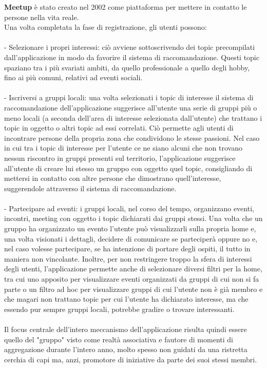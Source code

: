 \documentclass[fleqn,10pt]{SelfArx} %
\begin{document}
{\small %
\textbf{Meetup} è stato creato nel 2002 come piattaforma per mettere in contatto le persone nella vita reale.\\
Una volta completata la fase di registrazione, gli utenti possono: \\
\\
- Selezionare i propri interessi: ciò avviene sottoscrivendo dei topic precompilati dall'applicazione in modo da favorire il sistema di raccomandazione. 
Questi topic spaziano tra i più svariati ambiti, da quello professionale a quello degli hobby, fino ai più comuni, relativi ad eventi sociali. \\
\\
- Iscriversi a gruppi locali: una volta selezionati i topic di interesse il sistema di raccomandazione dell'applicazione suggerisce all'utente una serie di gruppi più o meno locali (a seconda dell'area di interesse selezionata dall'utente) che trattano i topic in oggetto o altri topic ad essi correlati. 
Ciò permette agli utenti di incontrare persone della propria zona che condividono le stesse passioni. 
Nel caso in cui tra i topic di interesse per l'utente ce ne siano alcuni che non trovano nessun riscontro in gruppi presenti sul territorio, l'applicazione suggerisce all'utente di creare lui stesso un gruppo con oggetto quel topic, consigliando di mettersi in contatto con altre persone che dimostrano quell'interesse, suggerendole attraverso il sistema di raccomandazione.\\
\\
- Partecipare ad eventi: i gruppi locali, nel corso del tempo, organizzano eventi, incontri, meeting con oggetto i topic dichiarati dai gruppi stessi. 
Una volta che un gruppo ha organizzato un evento l'utente può visualizzarli sulla propria home e, una volta visionati i dettagli, decidere di comunicare se parteciperà oppure no e, nel caso volesse partecipare, se ha intenzione di portare degli ospiti, il tutto in maniera non vincolante. 
Inoltre, per non restringere troppo la sfera di interessi degli utenti, l'applicazione permette anche di selezionare diversi filtri per la home, tra cui uno apposito per visualizzare eventi organizzati da gruppi di cui non si fa parte o un filtro ad hoc per visualizzare gruppi di cui l'utente non è già membro e che magari non trattano topic per cui l'utente ha dichiarato interesse, ma che essendo pur sempre gruppi locali, potrebbe gradire o trovare interessanti.\\
\\
Il focus centrale dell'intero meccanismo dell'applicazione risulta quindi essere quello del "gruppo" visto come realtà associativa e fautore di momenti di aggregazione durante l'intero anno, molto spesso non guidati da una ristretta cerchia di capi ma, anzi, promotore di iniziative da parte dei suoi stessi membri. 
}
\end{document}
